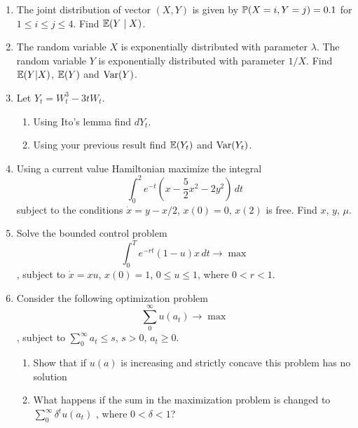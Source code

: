 \documentclass[12pt, a4paper]{article}
\begin{document}
\begin{enumerate}
\item The joint distribution of vector $(X,Y)$ is given by $\P(X=i,Y=j)=0.1$  for $1\leq i\leq j\leq 4$. Find $\E(Y\mid X)$.
\item The random variable $X$ is exponentially distributed with parameter $\lambda$. The random variable $Y$ is exponentially distributed with parameter $1/X$. Find $\E(Y|X)$, $\E(Y)$  and $\Var(Y)$.
\item Let $Y_t=W_t^3-3tW_t$.
\begin{enumerate}
\item Using Ito’s lemma find $dY_t$.
\item Using your previous result find $\E(Y_t)$ and $\Var(Y_t)$.
\end{enumerate}

\item Using a current value Hamiltonian maximize the integral
\[
\int_0^2 e^{-t}\left(x-\frac{5}{2}x^2-2y^2\right)\, dt
\]
subject to the conditions $\dot{x}=y-x/2$, $x(0)=0$, $x(2)$ is free. Find $x$, $y$, $\mu$.
\item Solve the bounded control problem
\[
\int_0^T e^{-rt}(1-u)x\, dt \to \max
\]
, subject to $\dot{x}=xu$, $x(0)=1$, $0\leq u\leq 1$, where $0<r<1$.
\item Consider the following optimization problem
\[
\sum_0^{\infty} u(a_t) \to \max
\]
, subject to $\sum_0^{\infty}a_t \leq s$, $s>0$, $a_t \geq 0$.
\begin{enumerate}
\item Show that if $u(a)$ is increasing and strictly concave this problem has no solution
\item What happens if the sum in the maximization problem is changed to $\sum_0^{\infty} \delta^t u(a_t)$ , where $0<\delta<1$?
\end{enumerate}


\end{enumerate}
\end{document}
